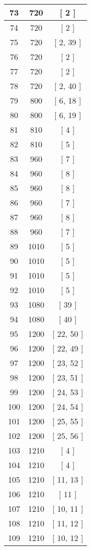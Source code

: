 \begin{center}
\begin{longtable}[H]{|| c c c ||}
73 & 720 & [ 2 ] \\ 
\hline
74 & 720 & [ 2 ] \\ 
\hline
75 & 720 & [ 2, 39 ] \\ 
\hline
76 & 720 & [ 2 ] \\ 
\hline
77 & 720 & [ 2 ] \\ 
\hline
78 & 720 & [ 2, 40 ] \\ 
\hline
79 & 800 & [ 6, 18 ] \\ 
\hline
80 & 800 & [ 6, 19 ] \\ 
\hline
81 & 810 & [ 4 ] \\ 
\hline
82 & 810 & [ 5 ] \\ 
\hline
83 & 960 & [ 7 ] \\ 
\hline
84 & 960 & [ 8 ] \\ 
\hline
85 & 960 & [ 8 ] \\ 
\hline
86 & 960 & [ 7 ] \\ 
\hline
87 & 960 & [ 8 ] \\ 
\hline
88 & 960 & [ 7 ] \\ 
\hline
89 & 1010 & [ 5 ] \\ 
\hline
90 & 1010 & [ 5 ] \\ 
\hline
91 & 1010 & [ 5 ] \\ 
\hline
92 & 1010 & [ 5 ] \\ 
\hline
93 & 1080 & [ 39 ] \\ 
\hline
94 & 1080 & [ 40 ] \\ 
\hline
95 & 1200 & [ 22, 50 ] \\ 
\hline
96 & 1200 & [ 22, 49 ] \\ 
\hline
97 & 1200 & [ 23, 52 ] \\ 
\hline
98 & 1200 & [ 23, 51 ] \\ 
\hline
99 & 1200 & [ 24, 53 ] \\ 
\hline
100 & 1200 & [ 24, 54 ] \\ 
\hline
101 & 1200 & [ 25, 55 ] \\ 
\hline
102 & 1200 & [ 25, 56 ] \\ 
\hline
103 & 1210 & [ 4 ] \\ 
\hline
104 & 1210 & [ 4 ] \\ 
\hline
105 & 1210 & [ 11, 13 ] \\ 
\hline
106 & 1210 & [ 11 ] \\ 
\hline
107 & 1210 & [ 10, 11 ] \\ 
\hline
108 & 1210 & [ 11, 12 ] \\ 
\hline
109 & 1210 & [ 10, 12 ] \\ 

\end{longtable}
\end{center}
